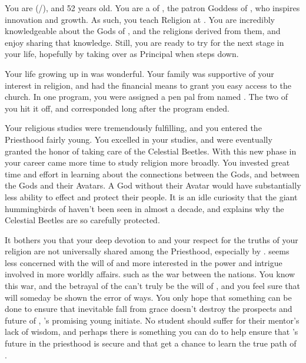 \documentclass[char]{GL2020}
\begin{document}
\name{\cBeetle{}}

You are \cBeetle{} (\cBeetle{\they}/\cBeetle{\them}), and 52 years old. You are a \cBeetle{\clergy} of \cTechGod{}, the patron Goddess of \pTech{}, who inspires innovation and growth. As such, you teach Religion at \pSchool{}. You are incredibly knowledgeable about the Gods of \pEarth{}, and the religions derived from them, and enjoy sharing that knowledge. Still, you are ready to try for the next stage in your life, hopefully by taking over as Principal when \cPrincipal{} steps down.

Your life growing up in \pTech{} was wonderful. Your family was supportive of your interest in religion, and had the financial means to grant you easy access to the church. In one program, you were assigned a pen pal from \pFarm{} named \cMusic{}. The two of you hit it off, and corresponded long after the program ended.

Your religious studies were tremendously fulfilling, and you entered the Priesthood fairly young. You excelled in your studies, and were eventually granted the honor of taking care of the Celestial Beetles. With this new phase in your career came more time to study religion more broadly. You invested great time and effort in learning about the connections between the Gods, and between the Gods and their Avatars. A God without their Avatar would have substantially less ability to effect \pEarth{} and protect their people. It is an idle curiosity that the giant hummingbirds of \cFarmGod{} haven’t been seen in almost a decade, and explains why the Celestial Beetles are so carefully protected.

It bothers you that your deep devotion to \cTechGod{} and your respect for the truths of your religion are not universally shared among the Priesthood, especially by \cAntiChup{}. \cAntiChup{} seems less concerned with the will of \cTechGod{} and more interested in the power and intrigue involved in more worldly affairs. such as the war between the nations.  You know this war, and the betrayal of the \pShippies{} can’t truly be the will of \cTechGod{}, and you feel sure that \cAntiChup{} will someday be shown the error of \cAntiChup{\their} ways. You only hope that something can be done to ensure that \cAntiChup{\their} inevitable fall from grace doesn’t destroy the prospects and future of \cScholarship{}, \cAntiChup{}’s promising young initiate. No student should suffer for their mentor’s lack of wisdom, and perhaps there is something you can do to help ensure that \cScholarship{}’s future in the priesthood is secure and that \cScholarship{\they} get a chance to learn the true path of \cTechGod{}.
\end{document}
